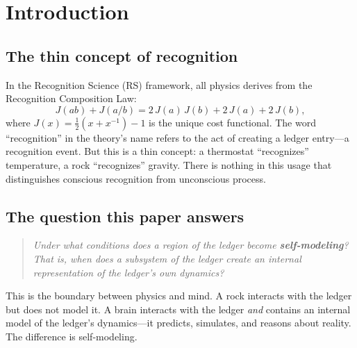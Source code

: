 \documentclass[11pt,a4paper]{article}
\theoremstyle{plain}
\theoremstyle{definition}
\theoremstyle{remark}
\newcommand{\Jcost}{J}
\begin{document}
\begin{abstract}
\medskip\noindent
\textbf{Lean formalization:}
\texttt{RecognitionScience.Foundation.MeasurementMechanism},
\texttt{VariationalDynamics}, \texttt{Entanglement}.

\medskip\noindent
\textbf{Companion paper:} ``The Binding Problem of Subjective Experience''
(Washburn, 2026) addresses topological binding.  This paper addresses the
prior question: \emph{what is being bound?}
\end{abstract}

\tableofcontents
\newpage

\section{Introduction}
\label{sec:intro}

\subsection{The thin concept of recognition}

In the Recognition Science (RS) framework, all physics derives from the
Recognition Composition Law:
\[
  \Jcost(ab) + \Jcost(a/b) = 2\,\Jcost(a)\,\Jcost(b) + 2\,\Jcost(a) + 2\,\Jcost(b),
\]
where $\Jcost(x) = \tfrac{1}{2}(x + x^{-1}) - 1$ is the unique cost
functional.  The word ``recognition'' in the theory's name refers to
the act of creating a ledger entry---a recognition event.  But this is
a thin concept: a thermostat ``recognizes'' temperature, a rock
``recognizes'' gravity.  There is nothing in this usage that
distinguishes conscious recognition from unconscious process.

\subsection{The question this paper answers}

\begin{quote}
\itshape
Under what conditions does a region of the ledger become
\textbf{self-modeling}?  That is, when does a subsystem of the ledger
create an internal representation of the ledger's own dynamics?
\end{quote}

This is the boundary between physics and mind.  A rock interacts with
the ledger but does not model it.  A brain interacts with the ledger
\emph{and} contains an internal model of the ledger's dynamics---it
predicts, simulates, and reasons about reality.  The difference is
self-modeling.
\end{document}
